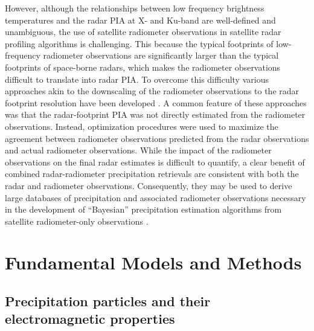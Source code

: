 \documentclass[10pt]{ietbook}
\begin{document}
However, although the relationships between low frequency brightness temperatures and the radar PIA at X- and Ku-band are well-defined and unambiguous, the use of satellite
radiometer observations in satellite radar profiling algorithms is challenging. This because the typical footprints of low-frequency radiometer observations are significantly
larger than the typical footprints of space-borne radars, which makes the radiometer observations difficult to translate into radar PIA. To overcome this difficulty various
approaches akin to the downscaling of the radiometer observations to the radar footprint resolution have been developed \cite{haddad1997,grecu2004,masunaga2005,munchak2011}.
A common feature of these approaches was that the radar-footprint PIA was not directly estimated from the radiometer observations. Instead, 
optimization procedures were used to maximize the agreement between radiometer observations predicted from the radar observations and actual radiometer observations.  While
the impact of the radiometer observations on the final radar estimates is difficult to quantify, a clear benefit of combined radar-radiometer precipitation retrievals
are consistent with both the radar and radiometer observations.  Consequently, they may be used to derive large databases of precipitation and associated radiometer observations
necessary in the development of “Bayesian” precipitation estimation algorithms from satellite
radiometer-only observations \cite{grecu2006,kummerow2011,hou2014}. 

\section{Fundamental Models and Methods}

\subsection{Precipitation particles and their electromagnetic properties}
\end{document}
